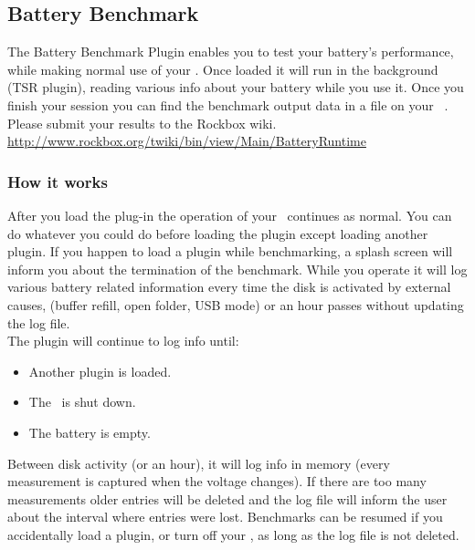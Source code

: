 \subsection{Battery Benchmark}
The Battery Benchmark Plugin enables you to test your battery's performance,
while making normal use of your \dap. Once loaded it will run in the
background (TSR plugin), reading various info about your battery while you use
it. Once you finish your session you can find the benchmark output data in a
file on your \dap\ .
Please submit your results to the Rockbox wiki.
\url{http://www.rockbox.org/twiki/bin/view/Main/BatteryRuntime}

\subsubsection{How it works}
After you load the plug-in the operation of your \dap\ continues as normal.
You can do whatever you could do before loading the plugin except loading
another plugin. If you happen to load a plugin while benchmarking, a splash
screen will inform you about the termination of the benchmark.
While you operate it will log various battery related information every time
the disk is activated by external causes, (buffer refill, open folder,
USB mode) or an hour passes without updating the log file.\\
The plugin will continue to log info until:

\begin{itemize}
\item Another plugin is loaded.
\item The \dap\ is shut down.
\item The battery is empty.
\end{itemize}
Between disk activity (or an hour), it will log info in memory (every
measurement is captured when the voltage changes). If there are too many
measurements older entries will be deleted and the log file will inform the
user about the interval where entries were lost. Benchmarks can be resumed if
you accidentally load a plugin, or turn off your \dap, as long as the log
file  is not deleted. 

